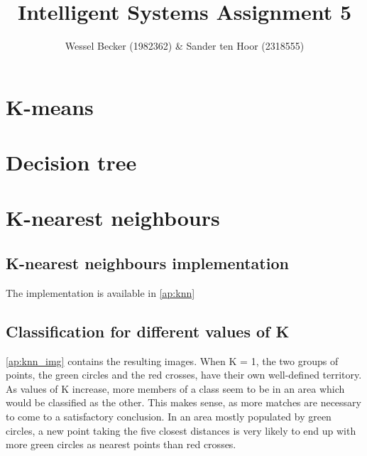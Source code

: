 \documentclass[10pt,a4paper]{article}
\begin{document}
\title{Intelligent Systems Assignment 5}
\author{Wessel Becker (1982362) \& Sander ten Hoor (2318555)}
\maketitle

\newcommand{\simplesubfigure}[3]{
  \noindent\begin{minipage}{.5\linewidth}
    \centering
    \texttt{[image: \#1]}
    \captionof{figure}{#2}
    \label{#3}
  \end{minipage}%
}
\newcommand{\simplefigure}[3]{
	\begin{figure}[H]
  	\centering
    	\makebox[\textwidth]
    	{
    		\texttt{[image: \#1]}
 		} \\
  		\caption{#2}
  		\label{#3}
	\end{figure}
}
\newcommand{\mcode}[1]{
	
}

\section{K-means}
\section{Decision tree}
\section{K-nearest neighbours}
\subsection{K-nearest neighbours implementation}
The implementation is available in \ref{ap:knn}

\subsection{Classification for different values of K} \label{ss:class}
\ref{ap:knn_img} contains the resulting images. When K = 1, the two groups of points, the green circles and the red crosses, have their own well-defined territory. As values of K increase, more members of a class seem to be in an area which would be classified as the other. This makes sense, as more matches are necessary to come to a satisfactory conclusion. In an area mostly populated by green circles, a new point taking the five closest distances is very likely to end up with more green circles as nearest points than red crosses.
\end{document}
